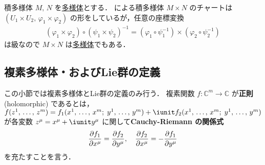 \documentclass[geometry_main]{subfiles}
\begin{document}
\begin{myexample}[label=ex:product-diffmani]{\cinfty 積多様体}
	$M,\, N$ を\hyperref[diffmani]{\cinfty 多様体}とする．
	による積多様体 $M \times N$ のチャートは $(U_1 \times U_2,\, \varphi_1 \times \varphi_2)$ の形をしているが，任意の座標変換
	\begin{align}
		(\varphi_1 \times \varphi_2) \circ (\psi_1 \times \psi_2)^{-1} = (\varphi_1 \circ \psi_1^{-1}) \times (\varphi_2 \circ \psi_2^{-1})
	\end{align}
	は\cinfty 級なので $M \times N$ は\hyperref[diffmani]{\cinfty 多様体}でもある．
\end{myexample}


	

\subsection{複素多様体・およびLie群の定義}


この小節では複素多様体とLie群の定義のみ行う．
複素関数 $f \colon \mathbb{C}^m \to \mathbb{C}$ が\textbf{正則} (holomorphic) であるとは，$f(z^1,\, \dots ,\, z^m) = f_1(x^1,\, \dots ,\, x^m;\; y^1,\, \dots ,\, y^m) + \iunit f_2(x^1,\, \dots ,\, x^m;\; y^1,\, \dots ,\, y^m)$ が各変数 $z^\mu = x^\mu + \iunit y^\mu$ に関して\textbf{Cauchy-Riemann の関係式}
\begin{align} 
	\pdv{f_1}{x^\mu} = \pdv{f_2}{y^\mu},\quad \pdv{f_2}{x^\mu} = -\pdv{f_1}{y^\mu}
\end{align}
を充たすことを言う．
\end{document}
